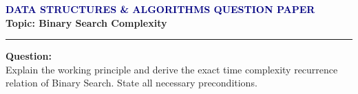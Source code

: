 \documentclass[11pt,a4paper]{article}
\begin{document}
\begin{center}
    {\large\bfseries\textcolor{navy}{DATA STRUCTURES \& ALGORITHMS QUESTION PAPER}}\\[0.2cm]
    {\bfseries Topic: Binary Search Complexity}
\end{center}
\hrule
\vspace{0.6cm}
\noindent\textbf{Question:}\\
Explain the working principle and derive the exact time complexity recurrence relation of Binary Search. State all necessary preconditions.
\end{document}
